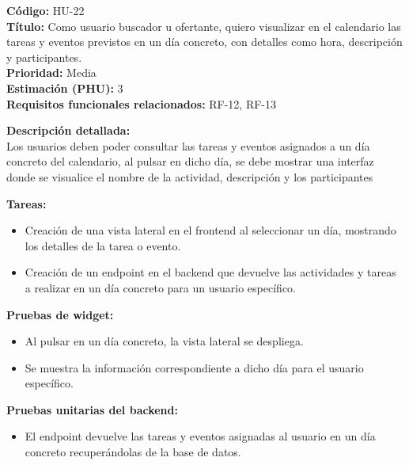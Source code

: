 \begin{tarjetaHU}
\textbf{Código:} HU-22 \\
\textbf{Título:} Como usuario buscador u ofertante, quiero visualizar en el calendario las tareas y eventos previstos en un día concreto, con detalles como hora, descripción y participantes. \\
\textbf{Prioridad:} Media \\
\textbf{Estimación (PHU):} 3 \\
\textbf{Requisitos funcionales relacionados:} RF-12, RF-13

\vspace{0.5em}
\textbf{Descripción detallada:} \\
Los usuarios deben poder consultar las tareas y eventos asignados a un día concreto del calendario, al pulsar en dicho día, se debe mostrar una interfaz donde se visualice el nombre de la actividad, descripción y los participantes

\vspace{0.5em}
\textbf{Tareas:}
\begin{itemize}[left=0pt]
  \item Creación de una vista lateral en el frontend al seleccionar un día, mostrando los detalles de la tarea o evento.
  \item Creación de un endpoint en el backend que devuelve las actividades y tareas a realizar en un día concreto para un usuario específico.
\end{itemize}

\vspace{0.5em}
\textbf{Pruebas de widget:}
\begin{itemize}[left=0pt]
  \item Al pulsar en un día concreto, la vista lateral se despliega.
  \item Se muestra la información correspondiente a dicho día para el usuario específico.
\end{itemize}
\textbf{Pruebas unitarias del backend:}
\begin{itemize}[left=0pt]
  \item El endpoint devuelve las tareas y eventos asignadas al usuario en un día concreto recuperándolas de la base de datos.
\end{itemize}
\end{tarjetaHU}

